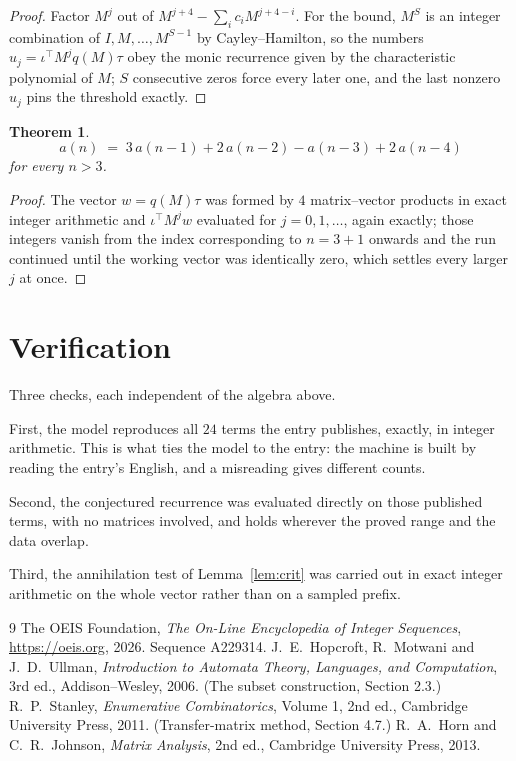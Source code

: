 \documentclass[11pt,a4paper]{article}
\theoremstyle{plain}
\newtheorem{theorem}{Theorem}
\theoremstyle{definition}
\begin{document}
\begin{proof}
Factor $M^{j}$ out of $M^{j+4}-\sum_ic_iM^{j+4-i}$. For the bound, $M^{S}$
is an integer combination of $I,M,\dots,M^{S-1}$ by Cayley--Hamilton, so the numbers
$u_j=\iota^{\!\top}M^{j}q(M)\tau$ obey the monic recurrence given by the characteristic
polynomial of $M$; $S$ consecutive zeros force every later one, and the last nonzero $u_j$
pins the threshold exactly.
\end{proof}

\begin{theorem}
\[
a(n)\;=\;3\,a(n-1) + 2\,a(n-2) - a(n-3) + 2\,a(n-4)
\]
for every $n>3$.
\end{theorem}

\begin{proof}
The vector $w=q(M)\tau$ was formed by $4$ matrix--vector products in exact integer
arithmetic and $\iota^{\!\top}M^{j}w$ evaluated for $j=0,1,\dots$, again exactly; those
integers vanish from the index corresponding to $n=3+1$ onwards and the run continued
until the working vector was identically zero, which settles every larger $j$ at once.
\end{proof}

\section{Verification}

Three checks, each independent of the algebra above.

First, the model reproduces all $24$ terms the entry publishes, exactly, in integer
arithmetic. This is what ties the model to the entry: the machine is built by reading the
entry's English, and a misreading gives different counts.

Second, the conjectured recurrence was evaluated directly on those published terms, with no
matrices involved, and holds wherever the proved range and the data overlap.

Third, the annihilation test of Lemma~\ref{lem:crit} was carried out in exact integer
arithmetic on the whole vector rather than on a sampled prefix.

\begin{thebibliography}{9}
 The OEIS Foundation, \emph{The On-Line Encyclopedia of Integer
Sequences}, \url{https://oeis.org}, 2026. Sequence A229314.
 J.~E.~Hopcroft, R.~Motwani and J.~D.~Ullman, \emph{Introduction to Automata
Theory, Languages, and Computation}, 3rd ed., Addison--Wesley, 2006. (The subset
construction, Section 2.3.)
 R.~P.~Stanley, \emph{Enumerative Combinatorics}, Volume 1, 2nd ed.,
Cambridge University Press, 2011. (Transfer-matrix method, Section 4.7.)
 R.~A.~Horn and C.~R.~Johnson, \emph{Matrix Analysis}, 2nd ed., Cambridge
University Press, 2013.
\end{thebibliography}
\end{document}
